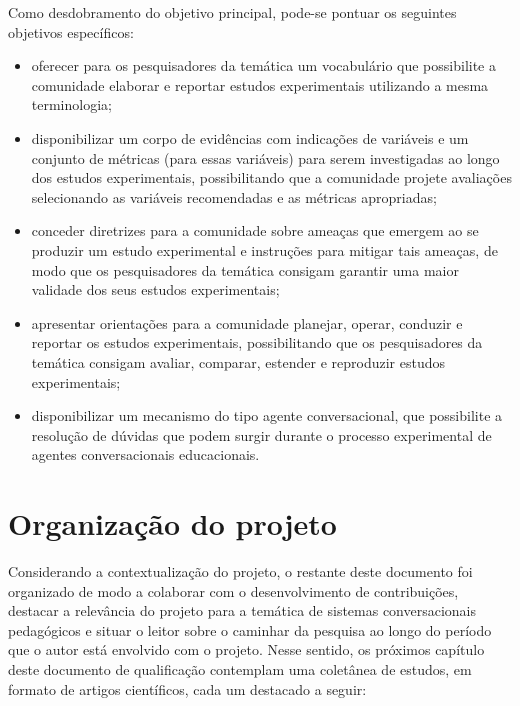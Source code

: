 
Como desdobramento do objetivo principal, pode-se pontuar os seguintes objetivos específicos:

 \begin{itemize}
\item oferecer para os pesquisadores da temática um vocabulário que possibilite a comunidade elaborar e reportar estudos experimentais utilizando a mesma terminologia;
\item disponibilizar um corpo de evidências com indicações de variáveis e um conjunto de métricas (para essas variáveis) para serem investigadas ao longo dos estudos experimentais, possibilitando que a comunidade projete avaliações selecionando as variáveis recomendadas e as métricas apropriadas;
\item conceder diretrizes para a comunidade sobre ameaças que emergem ao se produzir um estudo experimental e instruções para mitigar tais ameaças, de modo que os pesquisadores da temática consigam garantir uma maior validade dos seus estudos experimentais;
\item apresentar orientações para a comunidade planejar, operar, conduzir e reportar os estudos experimentais, possibilitando que os pesquisadores da temática consigam avaliar, comparar, estender e reproduzir estudos experimentais;
\item disponibilizar um mecanismo do tipo agente conversacional, que possibilite a resolução de dúvidas que podem surgir durante o processo experimental de agentes conversacionais educacionais.

 \end{itemize}


\section{Organização do projeto}

Considerando a contextualização do projeto, o restante deste documento foi organizado de modo a colaborar com o desenvolvimento de contribuições, destacar a relevância do projeto para a temática de sistemas conversacionais pedagógicos e situar o leitor sobre o caminhar da pesquisa ao longo do período que o autor está envolvido com o projeto. Nesse sentido, os próximos capítulo deste documento de qualificação contemplam uma coletânea de estudos, em formato de artigos científicos, cada um destacado a seguir:

